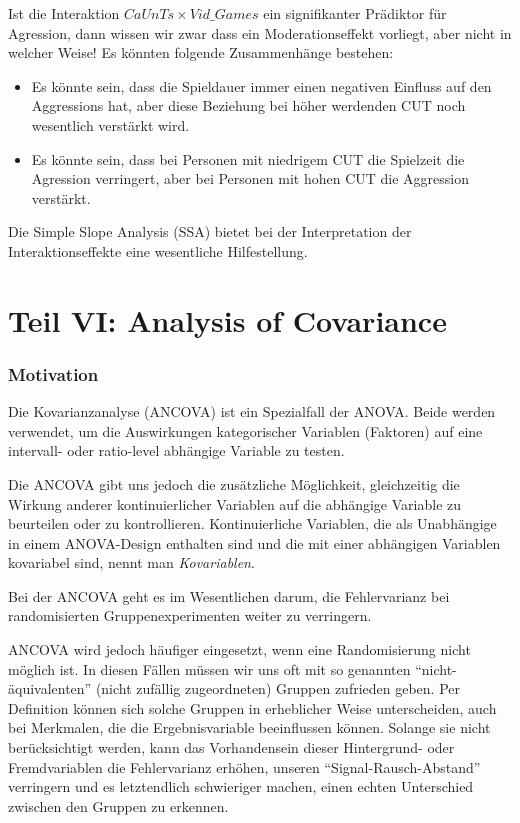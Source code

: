 \documentclass[]{article}
\providecommand{\tightlist}{%
  \setlength{\itemsep}{0pt}\setlength{\parskip}{0pt}}
\begin{document}
Ist die Interaktion \(CaUnTs \times Vid\_Games\) ein signifikanter Prädiktor für Agression, dann wissen wir zwar dass ein Moderationseffekt vorliegt, aber nicht in welcher Weise! Es könnten folgende Zusammenhänge bestehen:

\begin{itemize}
\tightlist
\item
  Es könnte sein, dass die Spieldauer immer einen negativen Einfluss auf den Aggressions hat, aber diese Beziehung bei höher werdenden CUT noch wesentlich verstärkt wird.
\item
  Es könnte sein, dass bei Personen mit niedrigem CUT die Spielzeit die Agression verringert, aber bei Personen mit hohen CUT die Aggression verstärkt.
\end{itemize}

Die Simple Slope Analysis (SSA) bietet bei der Interpretation der Interaktionseffekte eine wesentliche Hilfestellung.

\hypertarget{part-teil-vi-analysis-of-covariance}{%
\part*{Teil VI: Analysis of Covariance}\label{part-teil-vi-analysis-of-covariance}}

\hypertarget{motivation-1}{%
\section*{Motivation}\label{motivation-1}}

Die Kovarianzanalyse (ANCOVA) ist ein Spezialfall der ANOVA. Beide werden verwendet, um die Auswirkungen kategorischer Variablen (Faktoren) auf eine intervall- oder ratio-level abhängige Variable zu testen.

Die ANCOVA gibt uns jedoch die zusätzliche Möglichkeit, gleichzeitig die Wirkung anderer kontinuierlicher Variablen auf die abhängige Variable zu beurteilen oder zu kontrollieren. Kontinuierliche Variablen, die als Unabhängige in einem ANOVA-Design enthalten sind und die mit einer abhängigen Variablen kovariabel sind, nennt man \emph{Kovariablen}.

Bei der ANCOVA geht es im Wesentlichen darum, die Fehlervarianz bei randomisierten Gruppenexperimenten weiter zu verringern.

ANCOVA wird jedoch häufiger eingesetzt, wenn eine Randomisierung nicht möglich ist. In diesen Fällen müssen wir uns oft mit so genannten ``nicht-äquivalenten'' (nicht zufällig zugeordneten) Gruppen zufrieden geben. Per Definition können sich solche Gruppen in erheblicher Weise unterscheiden, auch bei Merkmalen, die die Ergebnisvariable beeinflussen können. Solange sie nicht berücksichtigt werden, kann das Vorhandensein dieser Hintergrund- oder Fremdvariablen die Fehlervarianz erhöhen, unseren ``Signal-Rausch-Abstand'' verringern und es letztendlich schwieriger machen, einen echten Unterschied zwischen den Gruppen zu erkennen.
\end{document}
